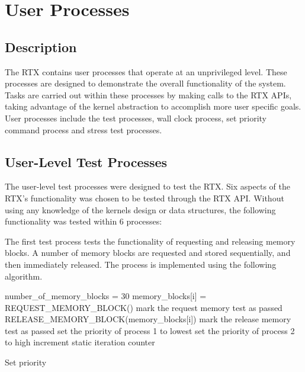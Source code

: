 \documentclass[12pt]{report}
\begin{document}
\section{User Processes}
\label{sec:user_processes}

\subsection{Description}
The RTX contains user processes that operate at an unprivileged level. These processes are designed to demonstrate the overall functionality of the system. Tasks are carried out within these processes by making calls to the RTX APIs, taking advantage of the kernel abstraction to accomplish more user specific goals. User processes include the test processes, wall clock process, set priority command process and stress test processes.


\subsection{User-Level Test Processes}
The user-level test processes were designed to test the RTX. Six aspects of the RTX’s functionality was chosen to be tested through the RTX API. Without using any knowledge of the kernels design or data structures, the following functionality was tested within 6 processes:
\newline
{}

\noindent The first test process tests the functionality of requesting and releasing memory blocks. A number of memory blocks are requested and stored sequentially, and then immediately released. The process is implemented using the following algorithm.
\begin{algorithmic}
  \State number\_of\_memory\_blocks = 30
    \State memory\_blocks[i] = REQUEST\_MEMORY\_BLOCK()
  \EndFor
  \State mark the request memory test as passed
    \State RELEASE\_MEMORY\_BLOCK(memory\_blocks[i])
  \EndFor
  \State mark the release memory test as passed
  \State set the priority of process 1 to lowest
  \State set the priority of process 2 to high
    \State increment static iteration counter
  \EndWhile
\EndFunction
\end{algorithmic}

Set priority
\end{document}
